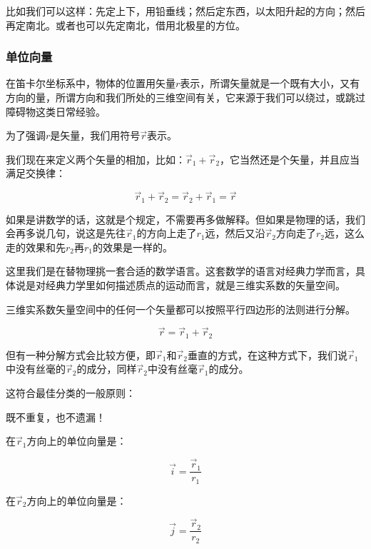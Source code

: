 比如我们可以这样：先定上下，用铅垂线；然后定东西，以太阳升起的方向；然后再定南北。或者也可以先定南北，借用北极星的方位。


\subsubsection{单位向量}

在笛卡尔坐标系中，物体的位置用矢量$r$表示，所谓矢量就是一个既有大小，又有方向的量，所谓方向和我们所处的三维空间有关，它来源于我们可以绕过，或跳过障碍物这类日常经验。

为了强调$r$是矢量，我们用符号$\vec r$表示。

我们现在来定义两个矢量的相加，比如：$\vec r_1 + \vec r_2$，它当然还是个矢量，并且应当满足交换律：

\begin{equation}
\vec r_1 + \vec r_2 = \vec r_2 + \vec r_1 = \vec r
\end{equation}

如果是讲数学的话，这就是个规定，不需要再多做解释。但如果是物理的话，我们会再多说几句，说这是先往$\vec r_1$的方向上走了$r_1$远，然后又沿$\vec r_2$方向走了$r_2$远，这么走的效果和先$r_2$再$r_1$的效果是一样的。

这里我们是在替物理挑一套合适的数学语言。这套数学的语言对经典力学而言，具体说是对经典力学里如何描述质点的运动而言，就是三维实系数的矢量空间。

三维实系数矢量空间中的任何一个矢量都可以按照平行四边形的法则进行分解。

\begin{equation}
\vec r = \vec r_1 + \vec r_2
\end{equation}

但有一种分解方式会比较方便，即$\vec r_1$和$\vec r_2$垂直的方式，在这种方式下，我们说$\vec r_1$中没有丝毫的$\vec r_2$的成分，同样$\vec r_2$中没有丝毫$\vec r_1$的成分。

这符合最佳分类的一般原则：

\begin{center}
既不重复，也不遗漏！
\end{center}

在$\vec r_1$方向上的单位向量是：

\begin{equation}
\vec i = \frac{\vec r_1}{r_1}
\end{equation}

在$\vec r_2$方向上的单位向量是：

\begin{equation}
\vec j = \frac{\vec r_2}{r_2}
\end{equation}

